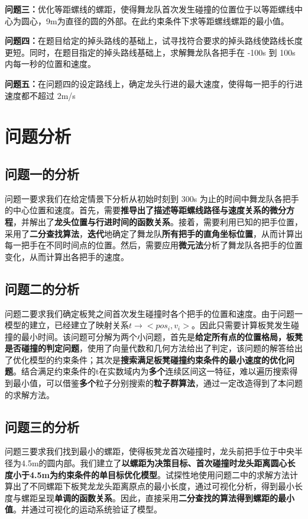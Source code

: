 \documentclass[a4paper]{article}
\begin{document}
		\textbf{问题三：}优化等距螺线的螺距，使得舞龙队首次发生碰撞的位置位于以等距螺线中心为圆心，9m为直径的圆的外部。在此约束条件下求等距螺线螺距的最小值。

		\textbf{问题四：}在题目给定的掉头路线的基础上，试寻找符合要求的掉头路线使路线长度更短。同时，在题目指定的掉头路线基础上，求解舞龙队各把手在 -100s 到 100s 内每一秒的位置和速度。

		\textbf{问题五：}在问题四的设定路线上，确定龙头行进的最大速度，使得每一把手的行进速度都不超过 2m/s

	\section{问题分析}
	\subsection{问题一的分析}
		问题一要求我们在给定情景下分析从初始时刻到 300s 为止的时间中舞龙队各把手的中心位置和速度。首先，需要\textbf{推导出了描述等距螺线路径与速度关系的微分方程}，并解出了\textbf{龙头位置与行进时间的函数关系}。接着，需要利用已知的把手位置，采用了\textbf{二分查找算法}，\textbf{迭代}地确定了舞龙队\textbf{所有把手的直角坐标位置}，从而计算出每一把手在不同时间点的位置。然后，需要应用\textbf{微元法}分析了舞龙队各把手的位置变化，从而计算出各把手的速度。
	\subsection{问题二的分析}
        问题二要求我们确定板凳之间首次发生碰撞时各个把手的位置和速度。由于问题一模型的建立，已经建立了映射关系$t\to<pos_i,v_i>$。因此只需要计算板凳发生碰撞的最小时间。该问题可分解为两个小问题，首先是\textbf{给定所有点的位置格局，板凳是否碰撞的判定问题}，使用了向量代数和几何方法给出了判定，该问题的解答给出了优化模型的约束条件；其次是\textbf{搜索满足板凳碰撞约束条件的最小速度的优化问题}。结合满足约束条件的t在实数域内为\textbf{多个}连续区间这一特征，难以遍历搜索得到最小值，可以借鉴\textbf{多个}粒子分别搜索的\textbf{粒子群算法}，通过一定改造得到了本问题的求解方法。
	\subsection{问题三的分析}
        问题三要求我们找到最小的螺距，使得板凳龙首次碰撞时，龙头前把手位于中央半径为4.5m的圆内部。我们建立了\textbf{以螺距为决策目标、首次碰撞时龙头距离圆心长度小于4.5m为约束条件的单目标优化模型}。试探性地使用问题二中的求解方法计算出了不同螺距下板凳龙龙头距离原点的最小长度，通过可视化分析，得到最小长度与螺距呈现\textbf{单调的函数关系}。因此，直接采用\textbf{二分查找的算法得到螺距的最小值}。并通过可视化的运动系统验证了模型。
\end{document}

